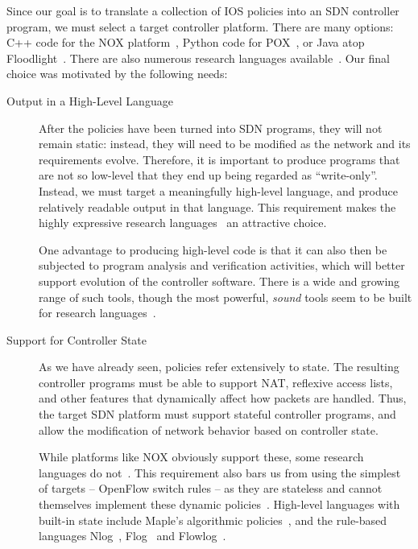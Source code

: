 Since our goal is to translate a collection of IOS policies into an SDN
controller program, we must select a target controller platform. There
are many options: C++ code for the NOX platform~\cite{gude:ccr08-nox},
Python code for POX~\cite{pox}, or Java atop Floodlight~\cite{floodlight}. There are also
numerous research languages
available~\cite{foster:icfp11-frenetic,katta:xldi12-flog,monsanto++:nsdi13-pyretic,ngdfk:hotsdn13-flowlog,Voellmy:2011,voellmy:hotsdn12-procera,Voellmy:2013}.
Our final choice was motivated by the
following needs:
\begin{description}

\item[Output in a High-Level Language] After the policies have been
  turned into SDN programs, they will not remain static: instead, they
  will need to be modified as the network and its requirements
  evolve. Therefore, it is important to produce programs that are not
  so low-level that they end up being regarded as
  ``write-only''. Instead, we must target a meaningfully high-level
  language, and produce relatively readable output in that
  language. This requirement makes the highly expressive research
  languages~\cite{foster:icfp11-frenetic,katta:xldi12-flog,koponen++:nsdi14-vmware-nlog,ngdfk:hotsdn13-flowlog,Voellmy:2013} an attractive choice.

  One advantage to producing high-level code is that it can also then
  be subjected to program analysis and verification activities, which
  will better support evolution of the controller software. There is a
  wide and growing range of such tools, though the most powerful,
  \emph{sound} tools seem to be built for research languages~\cite{guha:sdnverif,ngdfk:hotsdn13-flowlog}.

\item[Support for Controller State] As we have already seen, policies
  refer extensively to state.  The resulting controller programs must
  be able to support NAT, reflexive access lists, and other features
  that dynamically affect how packets are handled.  Thus, the target
  SDN platform must support stateful controller programs, and allow
  the modification of network behavior based on controller state.

  While platforms like NOX obviously support these, some research
  languages do not~\cite{monsanto:popl12-netcore,monsanto++:nsdi13-pyretic,Voellmy:2013}. This requirement also bars us from using
  the simplest of targets -- OpenFlow switch rules -- as they are
  stateless and cannot themselves implement these dynamic policies~\cite{McKeown:ccr08-openflow}.
  High-level languages with built-in state include Maple's algorithmic
  policies~\cite{Voellmy:2013}, and the rule-based languages Nlog~\cite{koponen++:nsdi14-vmware-nlog}, Flog~\cite{katta:xldi12-flog} and Flowlog~\cite{ngdfk:hotsdn13-flowlog}.


\end{description}
